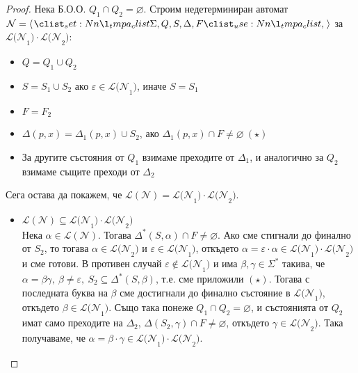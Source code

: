 \begin{proof}
    Нека Б.О.О. $Q_1 \cap Q_2 = \varnothing$.
    Строим недетерминиран автомат $\mathcal{N} = \opair{\Sigma, Q, S, \Delta, F}$ за $\mathcal{L(N}_1) \cdot \mathcal{L(N}_2)$:
    \begin{itemize}
        \item $Q = Q_1 \cup Q_2$
        \item $S = S_1 \cup S_2$ ако $\varepsilon \in \mathcal{L(N}_1)$, иначе $S = S_1$
        \item $F = F_2$
        \item $\Delta(p, x) = \Delta_1(p, x) \cup S_2$, ако $\Delta_1(p, x) \cap F \neq \varnothing \: (\star)$
        \item За другите състояния от $Q_1$ взимаме преходите от $\Delta_1$, и аналогично за $Q_2$ взимаме същите преходи от $\Delta_2$
    \end{itemize}

    Сега остава да покажем, че $\mathcal{L(N)} = \mathcal{L(N}_1) \cdot \mathcal{L(N}_2)$.
    \begin{itemize}
        \item $\mathcal{L(N)} \subseteq \mathcal{L(N}_1) \cdot \mathcal{L(N}_2)$ \\
              Нека $\alpha \in \mathcal{L(N)}$.
              Тогава $\Delta^*(S, \alpha) \cap F \neq \varnothing$.
              Ако сме стигнали до финално от $S_2$, то тогава $\alpha \in \mathcal{L(N}_2)$ и $\varepsilon \in \mathcal{L(N}_1)$,
              откъдето $\alpha = \varepsilon \cdot \alpha \in \mathcal{L(N}_1) \cdot \mathcal{L(N}_2)$ и сме готови.
              В противен случай $\varepsilon \notin \mathcal{L(N}_1)$ и има $\beta, \gamma \in \Sigma^*$ такива,
              че $\alpha = \beta \gamma, \: \beta \neq \varepsilon, \: S_2 \subseteq \Delta^*(S, \beta)$,  т.е. сме приложили $(\star)$.
              Тогава с последната буква на $\beta$ сме достигнали до финално състояние в $\mathcal{L(N}_1)$, откъдето $\beta \in \mathcal{L(N}_1)$.
              Също така понеже $Q_1 \cap Q_2 = \varnothing$, и състоянията от $Q_2$ имат само преходите на $\Delta_2$,
              $\Delta(S_2, \gamma) \cap F \neq \varnothing$, откъдето $\gamma \in \mathcal{L(N}_2)$.
              Така получаваме, че $\alpha = \beta \cdot \gamma \in \mathcal{L(N}_1) \cdot \mathcal{L(N}_2)$.


\end{itemize}
\end{proof}
